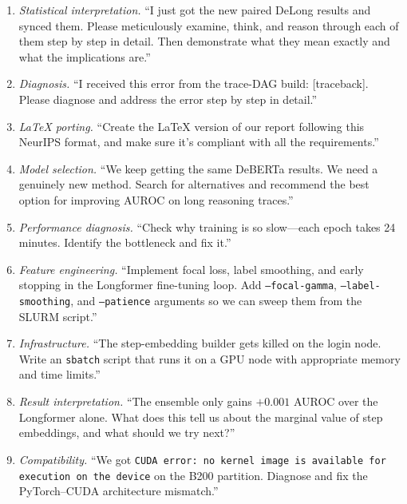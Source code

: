 \documentclass{article}
\begin{document}
\begin{enumerate}\itemsep0.3em

\item \emph{Statistical interpretation.} ``I just got the new paired
DeLong results and synced them. Please meticulously examine, think, and
reason through each of them step by step in detail. Then demonstrate what
they mean exactly and what the implications are.''

\item \emph{Diagnosis.} ``I received this error from the trace-DAG build:
[traceback]. Please diagnose and address the error step by step in
detail.''

\item \emph{LaTeX porting.} ``Create the LaTeX version of our report
following this NeurIPS format, and make sure it's compliant with all the requirements.''

\item \emph{Model selection.} ``We keep getting the same DeBERTa
results. We need a genuinely new method. Search for alternatives and
recommend the best option for improving AUROC on long reasoning traces.''

\item \emph{Performance diagnosis.} ``Check why training is so slow---each
epoch takes 24 minutes. Identify the bottleneck and fix it.''

\item \emph{Feature engineering.} ``Implement focal loss, label
smoothing, and early stopping in the Longformer fine-tuning loop. Add
\texttt{--focal-gamma}, \texttt{--label-smoothing}, and
\texttt{--patience} arguments so we can sweep them from the SLURM
script.''

\item \emph{Infrastructure.} ``The step-embedding builder gets killed on
the login node. Write an \texttt{sbatch} script that runs it on a GPU
node with appropriate memory and time limits.''

\item \emph{Result interpretation.} ``The ensemble only gains $+0.001$
AUROC over the Longformer alone. What does this tell us about the
marginal value of step embeddings, and what should we try next?''

\item \emph{Compatibility.} ``We got \texttt{CUDA error: no kernel image
is available for execution on the device} on the B200 partition.
Diagnose and fix the PyTorch--CUDA architecture mismatch.''

\end{enumerate}


\end{document}
